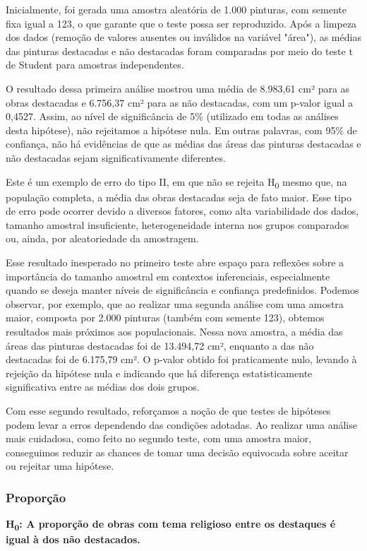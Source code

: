 \documentclass[11pt,a4paper]{article}
\begin{document}
Inicialmente, foi gerada uma amostra aleatória de 1.000 pinturas, com semente fixa igual a 123, o que garante que o teste possa ser reproduzido. Após a limpeza dos dados (remoção de valores ausentes ou inválidos na variável "área"), as médias das pinturas destacadas e não destacadas foram comparadas por meio do teste t de Student para amostras independentes.

O resultado dessa primeira análise mostrou uma média de 8.983,61 cm² para as obras destacadas e 6.756,37 cm² para as não destacadas, com um p-valor igual a 0,4527. Assim, ao nível de significância de 5\% (utilizado em todas as análises desta hipótese), não rejeitamos a hipótese nula. Em outras palavras, com 95\% de confiança, não há evidências de que as médias das áreas das pinturas destacadas e não destacadas sejam significativamente diferentes.

Este é um exemplo de erro do tipo II, em que não se rejeita H\textsubscript{0} mesmo que, na população completa, a média das obras destacadas seja de fato maior. Esse tipo de erro pode ocorrer devido a diversos fatores, como alta variabilidade dos dados, tamanho amostral insuficiente, heterogeneidade interna nos grupos comparados ou, ainda, por aleatoriedade da amostragem.

Esse resultado inesperado no primeiro teste abre espaço para reflexões sobre a importância do tamanho amostral em contextos inferenciais, especialmente quando se deseja manter níveis de significância e confiança predefinidos. Podemos observar, por exemplo, que ao realizar uma segunda análise com uma amostra maior, composta por 2.000 pinturas (também com semente 123), obtemos resultados mais próximos aos populacionais. Nessa nova amostra, a média das áreas das pinturas destacadas foi de 13.494,72 cm², enquanto a das não destacadas foi de 6.175,79 cm². O p-valor obtido foi praticamente nulo, levando à rejeição da hipótese nula e indicando que há diferença estatisticamente significativa entre as médias dos dois grupos.

Com esse segundo resultado, reforçamos a noção de que testes de hipóteses podem levar a erros dependendo das condições adotadas. Ao realizar uma análise mais cuidadosa, como feito no segundo teste, com uma amostra maior, conseguimos reduzir as chances de tomar uma decisão equivocada sobre aceitar ou rejeitar uma hipótese.
	
\subsubsection{Proporção}
\textbf{H\textsubscript{0}: A proporção de obras com tema religioso entre os destaques é igual à dos não destacados.}
\end{document}
